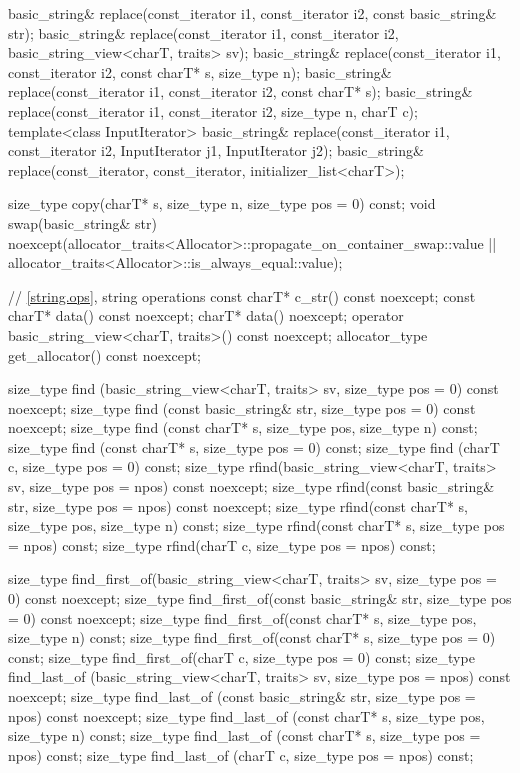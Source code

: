\begin{codeblock}
{{    basic_string& replace(const_iterator i1, const_iterator i2,
                          const basic_string& str);
    basic_string& replace(const_iterator i1, const_iterator i2,
                          basic_string_view<charT, traits> sv);
    basic_string& replace(const_iterator i1, const_iterator i2, const charT* s,
                          size_type n);
    basic_string& replace(const_iterator i1, const_iterator i2, const charT* s);
    basic_string& replace(const_iterator i1, const_iterator i2,
                          size_type n, charT c);
    template<class InputIterator>
      basic_string& replace(const_iterator i1, const_iterator i2,
                            InputIterator j1, InputIterator j2);
    basic_string& replace(const_iterator, const_iterator, initializer_list<charT>);

    size_type copy(charT* s, size_type n, size_type pos = 0) const;
    void swap(basic_string& str)
      noexcept(allocator_traits<Allocator>::propagate_on_container_swap::value ||
               allocator_traits<Allocator>::is_always_equal::value);

    // \ref{string.ops}, string operations
    const charT* c_str() const noexcept;
    const charT* data() const noexcept;
    charT* data() noexcept;
    operator basic_string_view<charT, traits>() const noexcept;
    allocator_type get_allocator() const noexcept;

    size_type find (basic_string_view<charT, traits> sv,
                    size_type pos = 0) const noexcept;
    size_type find (const basic_string& str, size_type pos = 0) const noexcept;
    size_type find (const charT* s, size_type pos, size_type n) const;
    size_type find (const charT* s, size_type pos = 0) const;
    size_type find (charT c, size_type pos = 0) const;
    size_type rfind(basic_string_view<charT, traits> sv,
                    size_type pos = npos) const noexcept;
    size_type rfind(const basic_string& str, size_type pos = npos) const noexcept;
    size_type rfind(const charT* s, size_type pos, size_type n) const;
    size_type rfind(const charT* s, size_type pos = npos) const;
    size_type rfind(charT c, size_type pos = npos) const;

    size_type find_first_of(basic_string_view<charT, traits> sv,
                            size_type pos = 0) const noexcept;
    size_type find_first_of(const basic_string& str,
                            size_type pos = 0) const noexcept;
    size_type find_first_of(const charT* s,
                            size_type pos, size_type n) const;
    size_type find_first_of(const charT* s, size_type pos = 0) const;
    size_type find_first_of(charT c, size_type pos = 0) const;
    size_type find_last_of (basic_string_view<charT, traits> sv,
                            size_type pos = npos) const noexcept;
    size_type find_last_of (const basic_string& str,
                            size_type pos = npos) const noexcept;
    size_type find_last_of (const charT* s,
                            size_type pos, size_type n) const;
    size_type find_last_of (const charT* s, size_type pos = npos) const;
    size_type find_last_of (charT c, size_type pos = npos) const;

}}
\end{codeblock}
